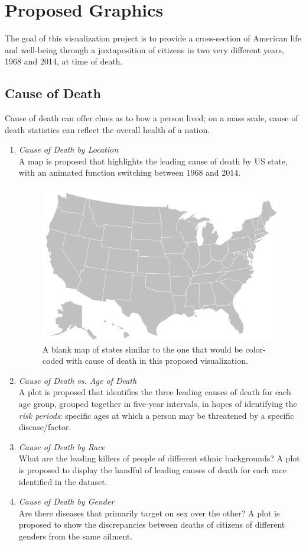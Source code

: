 \section{Proposed Graphics}

The goal of this visualization project is to provide a cross-section of American life and well-being through a juxtaposition of citizens in two very different years, 1968 and 2014, at time of death.



\subsection{Cause of Death}

Cause of death can offer clues as to how a person lived; on a mass scale, cause of death statistics can reflect the overall health of a nation.

\begin{enumerate}
\item \textit{Cause of Death by Location}\\
A map is proposed that highlights the leading cause of death by US state, with an animated function switching between 1968 and 2014.

\begin{figure}[H]
\centering
\includegraphics[width=0.5\linewidth]{usa_blank.png}
\caption{A blank map of states similar to the one that would be color-coded with cause of death in this proposed visualization.}
\end{figure}

\item \textit{Cause of Death vs. Age of Death}\\
A plot is proposed that identifies the three leading causes of death for each age group, grouped together in five-year intervals, in hopes of identifying the \textit{risk periods}: specific ages at which a person may be threatened by a specific disease/factor.

\item \textit{Cause of Death by Race}\\
What are the leading killers of people of different ethnic backgrounds? A plot is proposed to display the handful of leading causes of death for each race identified in the dataset.

\item \textit{Cause of Death by Gender}\\
Are there diseases that primarily target on sex over the other? A plot is proposed to show the discrepancies between deaths of citizens of different genders from the same ailment.
\end{enumerate}



